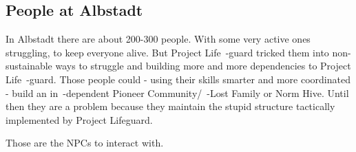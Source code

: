 
\subsection{People at Albstadt}

In Albstadt there are about 200-300 people. With some very active ones struggling, to keep everyone alive. But Project Life~-guard tricked them into non-sustainable ways to struggle and building more and more dependencies to Project Life~-guard. Those people could - using their skills smarter and more coordinated - build an in~-dependent Pioneer Community/~-Lost Family or Norm Hive. Until then they are a problem because they maintain the stupid structure tactically implemented by Project Lifeguard.

Those are the NPCs to interact with.


